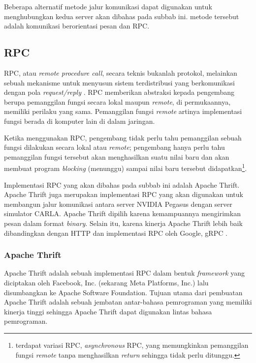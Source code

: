 Beberapa alternatif metode jalur komunikasi dapat digunakan untuk
meng\-hu\-bung\-kan kedua server akan dibahas pada subbab ini. metode tersebut
adalah komunikasi berorientasi pesan dan RPC.

\subsection{RPC}

RPC, atau \textit{remote procedure call}, secara teknis bukanlah protokol,
melainkan sebuah mekanisme untuk menyusun sistem terdistribusi yang
berkomunikasi dengan pola \textit{request/reply}
\parencite{larry_computerNetwork}. RPC memberikan abstraksi kepada pengembang
berupa pemanggilan fungsi secara lokal maupun \textit{remote}, di permukaannya,
memiliki perilaku yang sama. Pemanggilan fungsi \textit{remote} artinya
implementasi fungsi berada di komputer lain di dalam jaringan.

Ketika menggunakan RPC, pengembang tidak perlu tahu pemanggilan sebuah fung\-si
dilakukan secara lokal atau \textit{remote}; pengembang hanya perlu tahu
pemanggilan fungsi tersebut akan menghasilkan suatu nilai baru dan akan membuat
program \textit{blocking} (menunggu) sampai nilai baru tersebut
didapatkan\footnote{terdapat variasi RPC, \textit{asynchronous} RPC, yang
    memungkinkan pemanggilan fungsi \textit{remote} tanpa menghasilkan
    \textit{return} sehingga tidak perlu ditunggu.}.

Implementasi RPC yang akan dibahas pada subbab ini adalah Apache Thrift.
Apa\-che Thrift juga merupakan implementasi RPC yang akan digunakan untuk
membangun jalur komunikasi antara server NVIDIA Pegasus dengan server simulator
CARLA. Apache Thrift dipilih karena kemampuannya mengirimkan pesan dalam format
\textit{binary}. Selain itu, karena kinerja Apache Thrift lebih baik
dibandingkan dengan HTTP dan implementasi RPC oleh Google, gRPC
\parencite{abernethy_buildingHighPerformanceMSThrift}.

\subsubsection{Apache Thrift}

Apache Thrift adalah sebuah implementasi RPC dalam bentuk \textit{framework}
yang diciptakan oleh Facebook, Inc. (sekarang Meta Platforms, Inc.) lalu
disumbangkan ke Apache Software Foundation. Tujuan utama dari pembuatan Apache
Thrift adalah sebuah jembatan antar-bahasa pemrograman yang memiliki kinerja
tinggi \parencite{agarwal_thrift} sehingga Apache Thrift dapat digunakan lintas
bahasa pemrograman.

